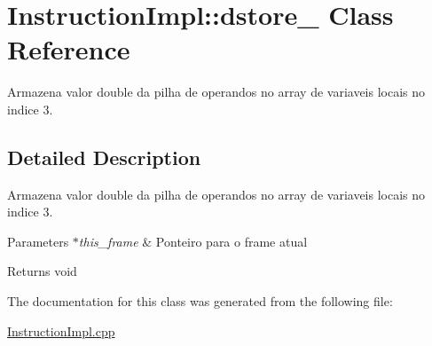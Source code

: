 \hypertarget{class_instruction_impl_1_1dstore__3}{}\section{Instruction\+Impl\+:\+:dstore\+\_ Class Reference}
\label{class_instruction_impl_1_1dstore__3}


Armazena valor double da pilha de operandos no array de variaveis locais no indice 3.  




\subsection{Detailed Description}
Armazena valor double da pilha de operandos no array de variaveis locais no indice 3. 


\begin{DoxyParams}{Parameters}
{\em $\ast$this\+\_\+frame} & Ponteiro para o frame atual \\
\hline
\end{DoxyParams}
\begin{DoxyReturn}{Returns}
void 
\end{DoxyReturn}


The documentation for this class was generated from the following file\+:\begin{DoxyCompactItemize}
\item 
\hyperlink{_instruction_impl_8cpp}{Instruction\+Impl.\+cpp}\end{DoxyCompactItemize}
